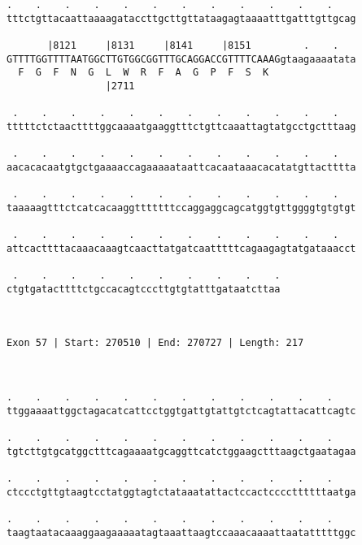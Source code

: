 \documentclass{article}
\begin{document}
\begin{Verbatim}
.    .    .    .    .    .    .    .    .    .    .    .    
tttctgttacaattaaaagataccttgcttgttataagagtaaaatttgatttgttgcag
                                                            
       |8121     |8131     |8141     |8151         .    .   
GTTTTGGTTTTAATGGCTTGTGGCGGTTTGCAGGACCGTTTTCAAAGgtaagaaaatata
  F  G  F  N  G  L  W  R  F  A  G  P  F  S  K               
                 |2711                                      
  
 .    .    .    .    .    .    .    .    .    .    .    .   
tttttctctaacttttggcaaaatgaaggtttctgttcaaattagtatgcctgctttaag
                                                            
 .    .    .    .    .    .    .    .    .    .    .    .   
aacacacaatgtgctgaaaaccagaaaaataattcacaataaacacatatgttactttta
                                                            
 .    .    .    .    .    .    .    .    .    .    .    .   
taaaaagtttctcatcacaaggtttttttccaggaggcagcatggtgttggggtgtgtgt
                                                            
 .    .    .    .    .    .    .    .    .    .    .    .   
attcacttttacaaacaaagtcaacttatgatcaatttttcagaagagtatgataaacct
                                                            
 .    .    .    .    .    .    .    .    .    .
ctgtgatacttttctgccacagtcccttgtgtatttgataatcttaa
                                               
                                               
 
Exon 57 | Start: 270510 | End: 270727 | Length: 217



.    .    .    .    .    .    .    .    .    .    .    .    
ttggaaaattggctagacatcattcctggtgattgtattgtctcagtattacattcagtc
                                                            
.    .    .    .    .    .    .    .    .    .    .    .    
tgtcttgtgcatggctttcagaaaatgcaggttcatctggaagctttaagctgaatagaa
                                                            
.    .    .    .    .    .    .    .    .    .    .    .    
ctccctgttgtaagtcctatggtagtctataaatattactccactccccttttttaatga
                                                            
.    .    .    .    .    .    .    .    .    .    .    .    
taagtaatacaaaggaagaaaaatagtaaattaagtccaaacaaaattaatatttttggc
                                                            

\end{Verbatim}
\end{document}
